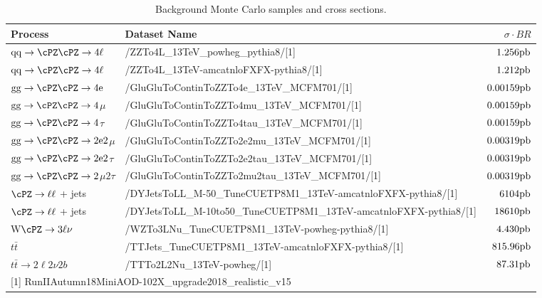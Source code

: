 \begin{table}
\begin{footnotesize}
    \centering
    \begin{tabular}{|l|l|r|}
   \hline
 Process & Dataset Name & $\sigma\cdot BR$ \\ \hline
 $\rm{qq} \to \cPZ\cPZ \to 4\ell$ & /ZZTo4L\_13TeV\_powheg\_pythia8/[1] & $1.256 \rm{pb}$ \\
 $\rm{qq} \to \cPZ\cPZ \to 4\ell$ & /ZZTo4L\_13TeV-amcatnloFXFX-pythia8/[1] & $1.212 \rm{pb}$ \\
 $\rm{gg} \rightarrow \cPZ\cPZ \to 4e$ & /GluGluToContinToZZTo4e\_13TeV\_MCFM701/[1] & $0.00159 \rm{ pb}$ \\
 $\rm{gg} \rightarrow \cPZ\cPZ \to 4$$\mu$ & /GluGluToContinToZZTo4mu\_13TeV\_MCFM701/[1] & $0.00159 \rm{ pb}$ \\
 $\rm{gg} \rightarrow \cPZ\cPZ \to 4$$\tau$ & /GluGluToContinToZZTo4tau\_13TeV\_MCFM701/[1] & $0.00159 \rm{ pb}$ \\
 $\rm{gg} \rightarrow \cPZ\cPZ \to 2e2$$\mu$ & /GluGluToContinToZZTo2e2mu\_13TeV\_MCFM701/[1] & $0.00319 \rm{ pb}$ \\
 $\rm{gg} \rightarrow \cPZ\cPZ \to 2e2$$\tau$ & /GluGluToContinToZZTo2e2tau\_13TeV\_MCFM701/[1] & $0.00319 \rm{ pb}$ \\
 $\rm{gg} \rightarrow \cPZ\cPZ \to 2$$\mu2$$\tau$ & /GluGluToContinToZZTo2mu2tau\_13TeV\_MCFM701/[1] & $0.00319 \rm{ pb}$ \\ \hline
 $\cPZ \to \ell\ell$ + jets & /DYJetsToLL\_M-50\_TuneCUETP8M1\_13TeV-amcatnloFXFX-pythia8/[1] & $6104 \rm{ pb}$ \\
 $\cPZ \to \ell\ell$ + jets  & /DYJetsToLL\_M-10to50\_TuneCUETP8M1\_13TeV-amcatnloFXFX-pythia8/[1] & $18610 \rm{ pb}$ \\ \hline
 W$\cPZ \to 3\ell\nu$ & /WZTo3LNu\_TuneCUETP8M1\_13TeV-powheg-pythia8/[1] & $4.430 \rm{ pb}$ \\ \hline
 $t\bar{t}$ & /TTJets\_TuneCUETP8M1\_13TeV-amcatnloFXFX-pythia8/[1] & $815.96 \rm{ pb}$ \\ 
 $t\bar{t} \to 2\ell2\nu 2b$ & /TTTo2L2Nu\_13TeV-powheg/[1] &  $87.31 \rm{pb}$ \\ \hline
\multicolumn{3}{l}{[1] RunIIAutumn18MiniAOD-102X\_upgrade2018\_realistic\_v15}\\
 \end{tabular}
 \caption{Background Monte Carlo samples and cross sections.}
  \label{tab:MCsamples}
\end{footnotesize}
\end{table}


